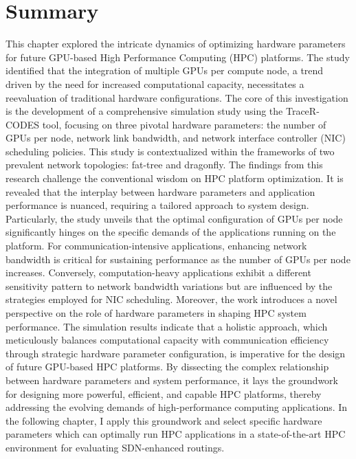 \section{Summary}
This chapter explored the intricate dynamics of optimizing hardware parameters for future GPU-based High Performance Computing (HPC) platforms. The study identified that the integration of multiple GPUs per compute node, a trend driven by the need for increased computational capacity, necessitates a reevaluation of traditional hardware configurations. The core of this investigation is the development of a comprehensive simulation study using the TraceR-CODES tool, focusing on three pivotal hardware parameters: the number of GPUs per node, network link bandwidth, and network interface controller (NIC) scheduling policies. This study is contextualized within the frameworks of two prevalent network topologies: fat-tree and dragonfly.
The findings from this research challenge the conventional wisdom on HPC platform optimization. It is revealed that the interplay between hardware parameters and application performance is nuanced, requiring a tailored approach to system design. Particularly, the study unveils that the optimal configuration of GPUs per node significantly hinges on the specific demands of the applications running on the platform. For communication-intensive applications, enhancing network bandwidth is critical for sustaining performance as the number of GPUs per node increases. Conversely, computation-heavy applications exhibit a different sensitivity pattern to network bandwidth variations but are influenced by the strategies employed for NIC scheduling.
Moreover, the work introduces a novel perspective on the role of hardware parameters in shaping HPC system performance. The simulation results indicate that a holistic approach, which meticulously balances computational capacity with communication efficiency through strategic hardware parameter configuration, is imperative for the design of future GPU-based HPC platforms.
By dissecting the complex relationship between hardware parameters and system performance, it lays the groundwork for designing more powerful, efficient, and capable HPC platforms, thereby addressing the evolving demands of high-performance computing applications.
In the following chapter, I apply this groundwork and select specific hardware parameters which can optimally run HPC applications in a state-of-the-art HPC environment for evaluating SDN-enhanced routings.
